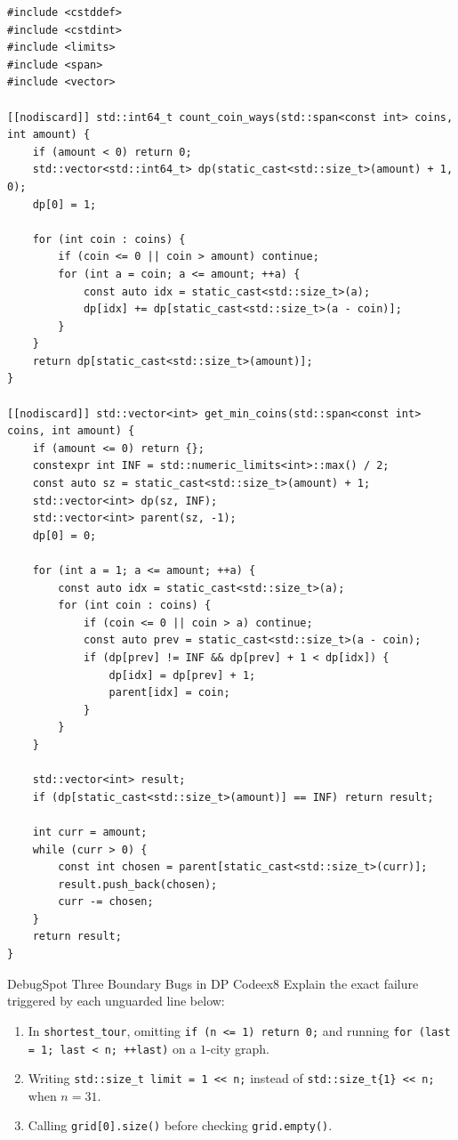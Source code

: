 \documentclass[11pt,a4paper]{article}
\theoremstyle{definition}
\begin{document}
\begin{lstlisting}[caption={Coin Change: combination count and parent-pointer reconstruction}]
#include <cstddef>
#include <cstdint>
#include <limits>
#include <span>
#include <vector>

[[nodiscard]] std::int64_t count_coin_ways(std::span<const int> coins, int amount) {
    if (amount < 0) return 0;
    std::vector<std::int64_t> dp(static_cast<std::size_t>(amount) + 1, 0);
    dp[0] = 1;

    for (int coin : coins) {
        if (coin <= 0 || coin > amount) continue;
        for (int a = coin; a <= amount; ++a) {
            const auto idx = static_cast<std::size_t>(a);
            dp[idx] += dp[static_cast<std::size_t>(a - coin)];
        }
    }
    return dp[static_cast<std::size_t>(amount)];
}

[[nodiscard]] std::vector<int> get_min_coins(std::span<const int> coins, int amount) {
    if (amount <= 0) return {};
    constexpr int INF = std::numeric_limits<int>::max() / 2;
    const auto sz = static_cast<std::size_t>(amount) + 1;
    std::vector<int> dp(sz, INF);
    std::vector<int> parent(sz, -1);
    dp[0] = 0;

    for (int a = 1; a <= amount; ++a) {
        const auto idx = static_cast<std::size_t>(a);
        for (int coin : coins) {
            if (coin <= 0 || coin > a) continue;
            const auto prev = static_cast<std::size_t>(a - coin);
            if (dp[prev] != INF && dp[prev] + 1 < dp[idx]) {
                dp[idx] = dp[prev] + 1;
                parent[idx] = coin;
            }
        }
    }

    std::vector<int> result;
    if (dp[static_cast<std::size_t>(amount)] == INF) return result;

    int curr = amount;
    while (curr > 0) {
        const int chosen = parent[static_cast<std::size_t>(curr)];
        result.push_back(chosen);
        curr -= chosen;
    }
    return result;
}
\end{lstlisting}

\begin{tryitbox}{Debug}{Spot Three Boundary Bugs in DP Code}{ex8}
Explain the exact failure triggered by each unguarded line below:
\begin{enumerate}
    \item In \texttt{shortest\_tour}, omitting \texttt{if (n <= 1) return 0;} and running \texttt{for (last = 1; last < n; ++last)} on a $1$-city graph.
    \item Writing \texttt{std::size\_t limit = 1 << n;} instead of \texttt{std::size\_t\{1\} << n;} when $n = 31$.
    \item Calling \texttt{grid[0].size()} before checking \texttt{grid.empty()}.
\end{enumerate}
\end{tryitbox}
\end{document}
